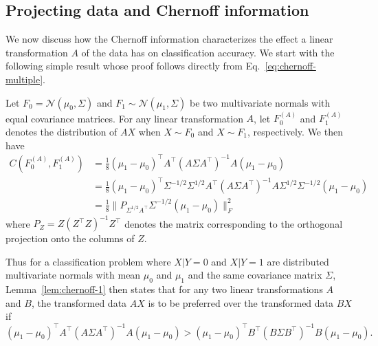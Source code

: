 \documentclass[10pt]{article}
\begin{document}
\subsection{Projecting data and Chernoff information}
We now discuss how the Chernoff information characterizes the effect a linear transformation $A$ of the data has on classification accuracy.
We start with the following simple result whose proof follows directly from Eq.~\eqref{eq:chernoff-multiple}. 
\begin{lem}
\label{lem:chernoff-1}
Let $F_0 = \mathcal{N}(\mu_0, \Sigma)$ and $F_1 \sim \mathcal{N}(\mu_1, \Sigma)$ be two multivariate normals with equal covariance matrices. For any linear transformation $A$, let $F_0^{(A)}$ and $F_1^{(A)}$ denotes the distribution of $AX$ when $X \sim F_0$ and $X \sim F_1$, respectively. We then have
\begin{equation}
\begin{split}
C(F_0^{(A)}, F_1^{(A)}) &= \frac{1}{8} (\mu_1 - \mu_0)^{\top} A^{\top} (A \Sigma A^{\top})^{-1} A (\mu_1 - \mu_0) \\ & = \frac{1}{8} (\mu_1 - \mu_0)^{\top} \Sigma^{-1/2} \Sigma^{1/2} A^{\top} (A \Sigma A^{\top})^{-1} A \Sigma^{1/2} \Sigma^{-1/2} (\mu_1 - \mu_0) \\
&= \frac{1}{8} \|P_{\Sigma^{1/2} A^{\top}} \Sigma^{-1/2} (\mu_1 - \mu_0) \|_{F}^{2}
\end{split}
\end{equation}
where $P_{Z} = Z(Z^{\top} Z)^{-1} Z^{\top}$ denotes the matrix corresponding to the orthogonal projection onto the columns of $Z$. 
\end{lem}

Thus for a classification problem where $X | Y = 0$ and $X | Y = 1$ are distributed multivariate normals with mean $\mu_0$ and $\mu_1$ and the same covariance matrix $\Sigma$, Lemma~\ref{lem:chernoff-1} then states that for any two linear transformations $A$ and $B$, the transformed data $AX$ is to be preferred over the transformed data $BX$ if
$$ (\mu_1 - \mu_0)^{\top} A^{\top} (A \Sigma A^{\top})^{-1} A (\mu_1 - \mu_0) > (\mu_1 - \mu_0)^{\top} B^{\top} (B \Sigma B^{\top})^{-1} B (\mu_1 - \mu_0). $$
\end{document}

